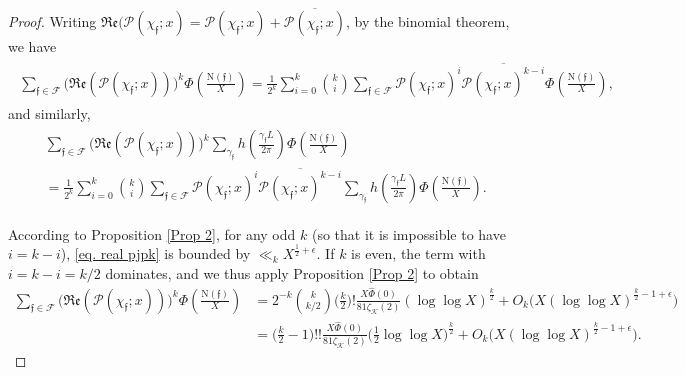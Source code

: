\documentclass[11pt]{amsart}
\newcommand{\norm}{\mathrm{N}}
\numberwithin{equation}{section}
\renewcommand{\Re}{{\mathfrak{Re}}}
\theoremstyle{remark}
\begin{document}
\begin{proof}
Writing $\Re(\mathcal{P}(\chi_\mathfrak{f}; x)= \mathcal{P}(\chi_\mathfrak{f}; x)+\overline{\mathcal{P}(\chi_\mathfrak{f}; x)}$, by the binomial theorem, we have
\begin{align}\label{eq. real pjpk}
 \begin{split}
\sum_{\mathfrak{f}\in\mathcal{F}}\big(\Re(\mathcal{P}(\chi_\mathfrak{f}; x))\big)^{k}\Phi\left(\frac{\norm(\mathfrak{f})}{X}\right)
=
\frac{1}{2^{k}}\sum_{i=0}^{k}{k \choose i}\sum_{\mathfrak{f}\in\mathcal{F}}\mathcal{P}(\chi_\mathfrak{f}; x)^{i}\overline{\mathcal{P}(\chi_\mathfrak{f}; x)^{k-i}}\Phi\left(\frac{\norm(\mathfrak{f})}{X}\right),
\end{split}
\end{align}
and similarly,
\begin{align}\label{eq. real pjpk with h}     \begin{split}
    &\sum_{\mathfrak{f}\in\mathcal{F}}\big(\Re(\mathcal{P}(\chi_\mathfrak{f}; x))\big)^{k}\sum_{\gamma_{\mathfrak{f}}} h\left( \frac{\gamma_{\mathfrak{f}} L}{2\pi}\right)\Phi\left(\frac{\norm(\mathfrak{f})}{X}\right)\\
    &=
    \frac{1}{2^{k}}\sum_{i=0}^{k}{k \choose i}\sum_{\mathfrak{f}\in\mathcal{F}}\mathcal{P}(\chi_\mathfrak{f}; x)^i\overline{\mathcal{P}(\chi_\mathfrak{f}; x)^{k-i}}
    \sum_{\gamma_{\mathfrak{f}}} h\left( \frac{\gamma_{\mathfrak{f}} L}{2\pi}\right)
    \Phi\left(\frac{\norm(\mathfrak{f})}{X}\right).
\end{split}
\end{align}

According to Proposition \ref{Prop 2}, for any odd $k$ (so that it is impossible to have $i= k-i$), \eqref{eq. real pjpk} is bounded by 
$
\ll_{k}  
X^{\frac{1}{2}+\epsilon}.
$
If $k$ is even, the term with $i=k-i=k/2$ dominates, and we thus apply Proposition \ref{Prop 2} to obtain 
\begin{align*}
\sum_{\mathfrak{f}\in\mathcal{F}}\big(\Re(\mathcal{P}(\chi_\mathfrak{f}; x))\big)^{k}\Phi\left(\frac{\norm(\mathfrak{f})}{X}\right)
&=2^{-k} {{k}\choose{k/2}}\Big(\frac{k}{2}\Big)! \frac{X\widehat{\Phi}(0)}{81\zeta_\mathcal{K}(2)}  (\log\log X)^{\frac{k}{2}}+O_{k}\big(X(\log\log X)^{\frac{k}{2}-1+\epsilon}\big)\\
&=\Big(\frac{k}{2}-1\Big)!! \frac{X\widehat{\Phi}(0)}{81\zeta_\mathcal{K}(2)} \Big(\frac{1}{2}\log\log X\Big)^{\frac{k}{2}}+O_{k}\big(X(\log\log X)^{\frac{k}{2}-1+\epsilon}\big).
\end{align*}


\end{proof}
\end{document}
